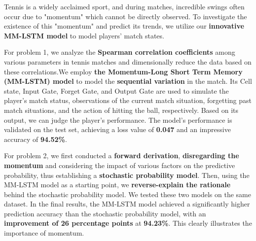 \documentclass[12pt]{article}
\begin{document}
Tennis is a widely acclaimed sport, and during matches, incredible swings often occur due to "momentum" which cannot be directly observed. To investigate the existence of this "momentum" and predict its trends, we utilize our \textbf{innovative MM-LSTM model} to model players' match states.


For problem 1, we analyze the \textbf{Spearman correlation coefficients} among various parameters in tennis matches and dimensionally reduce the data based on these correlations.We employ \textbf{the Momentum-Long Short Term Memory (MM-LSTM) model} to model the \textbf{sequential variation} in the match. Its Cell state, Input Gate, Forget Gate, and Output Gate are used to simulate the player's match status, observations of the current match situation, forgetting past match situations, and the action of hitting the ball, respectively. Based on its output, we can judge the player's performance. The model's performance is validated on the test set, achieving a loss value of \textbf{0.047} and an impressive accuracy of \textbf{94.52\%}.



For problem 2, we first conducted a \textbf{forward derivation}, \textbf{disregarding the momentum} and considering the impact of various factors on the predictive probability, thus establishing a \textbf{stochastic probability model}. Then, using the MM-LSTM model as a starting point, we \textbf{reverse-explain  the rationale} behind the stochastic probability model. We tested these two models on the same dataset. In the final results, the MM-LSTM model achieved a significantly higher prediction accuracy than the stochastic probability model, with an \textbf{improvement of 26 percentage points} at \textbf{94.23\%}. This clearly illustrates the importance of momentum.
\end{document}
